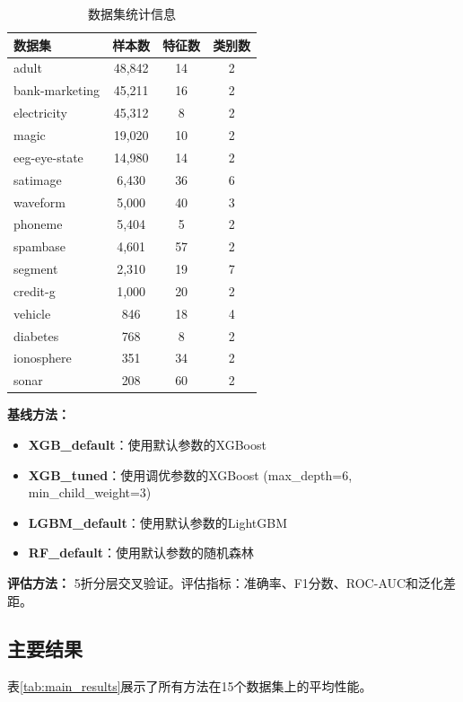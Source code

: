 \documentclass[12pt,a4paper]{article}
\begin{document}
\begin{table}[htbp]
\caption{数据集统计信息}
\label{tab:datasets}
\centering
\begin{tabular}{lccc}
\toprule
数据集 & 样本数 & 特征数 & 类别数 \\
\midrule
adult & 48,842 & 14 & 2 \\
bank-marketing & 45,211 & 16 & 2 \\
electricity & 45,312 & 8 & 2 \\
magic & 19,020 & 10 & 2 \\
eeg-eye-state & 14,980 & 14 & 2 \\
satimage & 6,430 & 36 & 6 \\
waveform & 5,000 & 40 & 3 \\
phoneme & 5,404 & 5 & 2 \\
spambase & 4,601 & 57 & 2 \\
segment & 2,310 & 19 & 7 \\
credit-g & 1,000 & 20 & 2 \\
vehicle & 846 & 18 & 4 \\
diabetes & 768 & 8 & 2 \\
ionosphere & 351 & 34 & 2 \\
sonar & 208 & 60 & 2 \\
\bottomrule
\end{tabular}
\end{table}

\textbf{基线方法：}
\begin{itemize}[leftmargin=2em]
    \item \textbf{XGB\_default}：使用默认参数的XGBoost
    \item \textbf{XGB\_tuned}：使用调优参数的XGBoost (max\_depth=6, min\_child\_weight=3)
    \item \textbf{LGBM\_default}：使用默认参数的LightGBM
    \item \textbf{RF\_default}：使用默认参数的随机森林
\end{itemize}

\textbf{评估方法：} 5折分层交叉验证。评估指标：准确率、F1分数、ROC-AUC和泛化差距。

\subsection{主要结果}

表\ref{tab:main_results}展示了所有方法在15个数据集上的平均性能。
\end{document}
